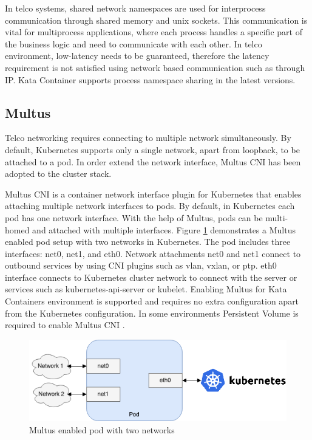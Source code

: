 In telco systems, shared network namespaces are used for interprocess communication through shared memory and unix sockets. This communication is vital for multiprocess applications, where each process handles a specific part of the business logic and need to communicate with each other. In telco environment, low-latency needs to be guaranteed, therefore the latency requirement is not satisfied using network based communication such as through IP. Kata Container supports process namespace sharing in the latest versions.

\subsection{Multus}

Telco networking requires connecting to multiple network simultaneously. By default, Kubernetes supports only a single network, apart from loopback, to be attached to a pod. In order extend the network interface, Multus CNI has been adopted to the cluster stack.

Multus CNI \cite{Multus} is a container network interface plugin for Kubernetes that enables attaching multiple network interfaces to pods. By default, in Kubernetes each pod has one network interface. With the help of Multus, pods can be multi-homed and attached with multiple interfaces. Figure \ref{fig:Multus} demonstrates a Multus enabled pod setup with two networks in Kubernetes. The pod includes three interfaces: net0, net1, and eth0. Network attachments net0 and net1 connect to outbound services by using CNI plugins such as vlan, vxlan, or ptp. eth0 interface connects to Kubernetes cluster network to connect with the server or services such as kubernetes-api-server or kubelet. Enabling Multus for Kata Containers environment is supported and requires no extra configuration apart from the Kubernetes configuration. In some environments Persistent Volume is required to enable Multus CNI \cite{MultusUbuntu}.

\begin{figure}[ht]
  \begin{center}
    \includegraphics[width=13.5cm]{images/Multus.png}
    \caption{Multus enabled pod with two networks}
    \label{fig:Multus}
  \end{center}
\end{figure}

